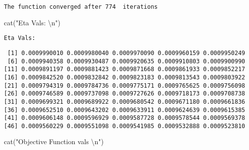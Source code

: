 \documentclass[
  letterpaper,
  DIV=11,
  numbers=noendperiod]{scrartcl}
\newenvironment{Shaded}{\begin{snugshade}}{\end{snugshade}}
\newcommand{\DecValTok}[1]{\textcolor[rgb]{0.68,0.00,0.00}{#1}}
\newcommand{\FunctionTok}[1]{\textcolor[rgb]{0.28,0.35,0.67}{#1}}
\newcommand{\NormalTok}[1]{\textcolor[rgb]{0.00,0.23,0.31}{#1}}
\newcommand{\SpecialCharTok}[1]{\textcolor[rgb]{0.37,0.37,0.37}{#1}}
\newcommand{\StringTok}[1]{\textcolor[rgb]{0.13,0.47,0.30}{#1}}
\begin{document}
\begin{Shaded}
\end{Shaded}

\begin{verbatim}
The function converged after 774  iterations 
\end{verbatim}

\begin{Shaded}
\begin{Highlighting}[]
\FunctionTok{cat}\NormalTok{(}\StringTok{"Eta Vals: }\SpecialCharTok{\textbackslash{}n}\StringTok{"}\NormalTok{)}
\end{Highlighting}
\end{Shaded}

\begin{verbatim}
Eta Vals: 
\end{verbatim}

\begin{Shaded}
\end{Shaded}

\begin{verbatim}
 [1] 0.0009990010 0.0009980040 0.0009970090 0.0009960159 0.0009950249
 [6] 0.0009940358 0.0009930487 0.0009920635 0.0009910803 0.0009900990
[11] 0.0009891197 0.0009881423 0.0009871668 0.0009861933 0.0009852217
[16] 0.0009842520 0.0009832842 0.0009823183 0.0009813543 0.0009803922
[21] 0.0009794319 0.0009784736 0.0009775171 0.0009765625 0.0009756098
[26] 0.0009746589 0.0009737098 0.0009727626 0.0009718173 0.0009708738
[31] 0.0009699321 0.0009689922 0.0009680542 0.0009671180 0.0009661836
[36] 0.0009652510 0.0009643202 0.0009633911 0.0009624639 0.0009615385
[41] 0.0009606148 0.0009596929 0.0009587728 0.0009578544 0.0009569378
[46] 0.0009560229 0.0009551098 0.0009541985 0.0009532888 0.0009523810
\end{verbatim}

\begin{Shaded}
\begin{Highlighting}[]
\FunctionTok{cat}\NormalTok{(}\StringTok{"Objective Function vals }\SpecialCharTok{\textbackslash{}n}\StringTok{"}\NormalTok{)}
\end{Highlighting}
\end{Shaded}
\end{document}
